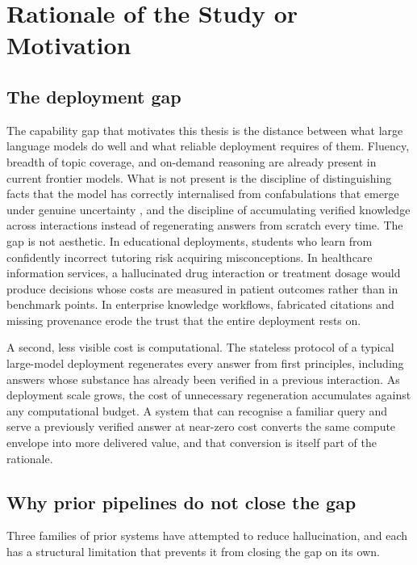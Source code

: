 \section{Rationale of the Study or Motivation}
\label{sec:rationale}

\subsection{The deployment gap}
\label{sec:deployment-gap}

The capability gap that motivates this thesis is the distance between what large language models do well and what reliable deployment requires of them. Fluency, breadth of topic coverage, and on-demand reasoning are already present in current frontier models. What is not present is the discipline of distinguishing facts that the model has correctly internalised from confabulations that emerge under genuine uncertainty \cite{farquhar2024semantic}, and the discipline of accumulating verified knowledge across interactions instead of regenerating answers from scratch every time. The gap is not aesthetic. In educational deployments, students who learn from confidently incorrect tutoring risk acquiring misconceptions. In healthcare information services, a hallucinated drug interaction or treatment dosage would produce decisions whose costs are measured in patient outcomes rather than in benchmark points. In enterprise knowledge workflows, fabricated citations and missing provenance erode the trust that the entire deployment rests on.

A second, less visible cost is computational. The stateless protocol of a typical large-model deployment regenerates every answer from first principles, including answers whose substance has already been verified in a previous interaction. As deployment scale grows, the cost of unnecessary regeneration accumulates against any computational budget. A system that can recognise a familiar query and serve a previously verified answer at near-zero cost converts the same compute envelope into more delivered value, and that conversion is itself part of the rationale.

\subsection{Why prior pipelines do not close the gap}
\label{sec:prior-pipelines}

Three families of prior systems have attempted to reduce hallucination, and each has a structural limitation that prevents it from closing the gap on its own.

